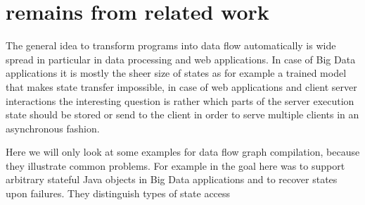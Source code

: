 \documentclass{scrartcl}
\begin{document}
\section{remains from related work}
The general idea to transform programs into data flow automatically is wide spread in particular in data processing and web applications. In case of Big Data applications it is mostly the sheer size of states as for example a trained model that makes 
state transfer impossible, in case of web applications and client server interactions the interesting question is rather which parts of the server execution state should be stored or send to the client in order to serve multiple clients in an asynchronous fashion.

Here we will only look at some examples for data flow graph compilation, because they illustrate common problems. For example in \cite{fernandez2014making} the goal here was to support arbitrary stateful Java objects in Big Data applications and to recover states upon failures. They distinguish types of state access 
\end{document}
